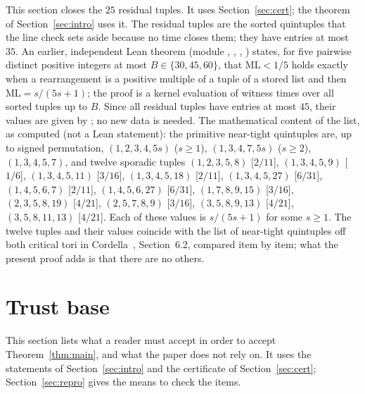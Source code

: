 \documentclass[11pt]{article}
\theoremstyle{remark}
\newcommand{\ML}{\mathrm{ML}}
\begin{document}
This section closes the $25$ residual tuples. It uses Section~\ref{sec:cert}; the theorem of Section~\ref{sec:intro} uses it. The residual tuples are the sorted quintuples that the line check sets aside because no time closes them; they have entries at most $35$. An earlier, independent Lean theorem (module , , , ) states, for five pairwise distinct positive integers at most $B\in\{30,45,60\}$, that $\ML<1/5$ holds exactly when a rearrangement is a positive multiple of a tuple of a stored list and then $\ML=s/(5s+1)$; the proof is a kernel evaluation of witness times over all sorted tuples up to $B$. Since all residual tuples have entries at most $45$, their values are given by ; no new data is needed.
The mathematical content of the list, as computed (not a Lean statement): the primitive near-tight quintuples are, up to signed permutation, $(1,2,3,4,5s)$ ($s\ge1$), $(1,3,4,7,5s)$ ($s\ge2$), $(1,3,4,5,7)$, and twelve sporadic tuples $(1,2,3,5,8)$ [$2/11$], $(1,3,4,5,9)$ [$1/6$], $(1,3,4,5,11)$ [$3/16$], $(1,3,4,5,18)$ [$2/11$], $(1,3,4,5,27)$ [$6/31$], $(1,4,5,6,7)$ [$2/11$], $(1,4,5,6,27)$ [$6/31$], $(1,7,8,9,15)$ [$3/16$], $(2,3,5,8,19)$ [$4/21$], $(2,5,7,8,9)$ [$3/16$], $(3,5,8,9,13)$ [$4/21$], $(3,5,8,11,13)$ [$4/21$].
Each of these values is $s/(5s+1)$ for some $s\ge1$. The twelve tuples and their values coincide with the list of near-tight quintuples off both critical tori in Cordella~\cite{Cordella}, Section~6.2, compared item by item; what the present proof adds is that there are no others.

\section{Trust base}\label{sec:trust}

This section lists what a reader must accept in order to accept Theorem~\ref{thm:main}, and what the paper does not rely on. It uses the statements of Section~\ref{sec:intro} and the certificate of Section~\ref{sec:cert}; Section~\ref{sec:repro} gives the means to check the items.
\end{document}
